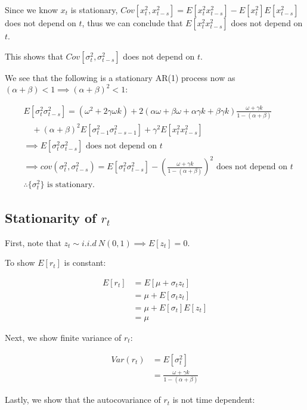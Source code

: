 \documentclass{article}
\begin{document}
Since we know $x_t$ is stationary, $Cov[x_t^2,x_{t-s}^2] = E[x_t^2 x_{t-s}^2] - E[x_t^2]E[x_{t-s}^2]$ does not depend on $t$, thus we can conclude that $E[x_t^2 x_{t-s}^2]$ does not depend on $t$.

This shows that $Cov[\sigma_t^2,\sigma_{t-s}^2]$ does not depend on $t$.

We see that the following is a stationary AR(1) process now as $(\alpha+\beta) < 1 \implies  (\alpha+\beta)^2 < 1$:

\[
\begin{split}
&E[\sigma_t^2 \sigma_{t-s}^2] = (\omega^2 + 2\gamma \omega k) + 2(\alpha\omega + \beta\omega + \alpha\gamma k + \beta\gamma k) \frac{\omega+\gamma k}{1-(\alpha+\beta)} \\
&\quad + (\alpha+\beta)^2 E[\sigma_{t-1}^2\sigma_{t-s-1}^2] + \gamma^2 E[x_t^2 x_{t-s}^2] \\
&\implies E[\sigma_t^2 \sigma_{t-s}^2] \text{ does not depend on }t \\
&\implies cov(\sigma_t^2, \sigma_{t-s}^2) = E[\sigma_t^2 \sigma_{t-s}^2] - \left(\frac{\omega+\gamma k}{1-(\alpha+\beta)}\right)^2 \text{ does not depend on }t \\
&\therefore \{\sigma_t^2\} \text{ is stationary}.
\end{split}
\]

\subsection{Stationarity of $r_t$}

First, note that $z_t \sim i.i.d \ N(0,1) \implies E[z_t] = 0$.

To show $E[r_t]$ is constant:

\[
\begin{split}
E[r_t] &= E[\mu + \sigma_t z_t] \\
        &= \mu + E[\sigma_t z_t] \\
        &= \mu + E[\sigma_t]E[z_t] \\
        &= \mu
\end{split}
\]

Next, we show finite variance of $r_t$:

\[
\begin{split}
Var(r_t) &= E[\sigma_t^2] \\ 
        &= \frac{\omega + \gamma k}{1-(\alpha+\beta)}
\end{split}
\]

Lastly, we show that the autocovariance of $r_t$ is not time dependent:
\end{document}

